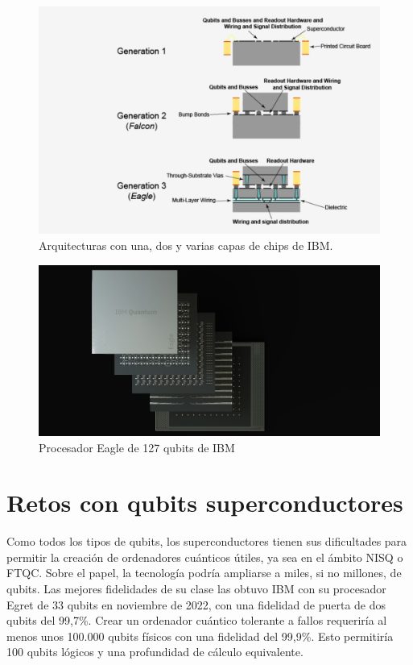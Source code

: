 	\begin{figure}[h!]
	\centering 
	\includegraphics[width=1\linewidth]{Figuras/Fig_scq_MLW.png}
	\caption{Arquitecturas con una, dos y varias capas de chips de IBM.}
	\label{Fig_scq_MLW}
	\end{figure}

	\begin{figure}[h!]
	\centering 
	\includegraphics[width=1\linewidth]{Figuras/Fig_scq_eagle_127.jpeg}
	\caption{Procesador Eagle de 127 qubits de IBM}
	\label{Fig_scq_eagle_127}
	\end{figure}





\newpage
\section{Retos con qubits superconductores}

Como todos los tipos de qubits, los superconductores tienen sus dificultades para permitir la creación de ordenadores cuánticos útiles, ya sea en el ámbito NISQ o FTQC. Sobre el papel, la tecnología podría ampliarse a miles, si no millones, de qubits. Las mejores fidelidades de su clase las obtuvo IBM con su procesador Egret de 33 qubits en noviembre de 2022, con una fidelidad de puerta de dos qubits del 99,7\%. Crear un ordenador cuántico tolerante a fallos requeriría al menos unos 100.000 qubits físicos con una fidelidad del 99,9\%. Esto permitiría 100 qubits lógicos y una profundidad de cálculo equivalente. 

